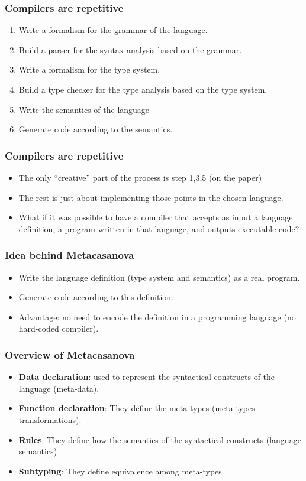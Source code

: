 \documentclass[10pt,a4paper]{beamer}
\begin{document}
\begin{frame}
	\frametitle{Compilers are repetitive}
	\begin{enumerate}
		\item Write a formalism for the grammar of the language.
		\item Build a parser for the syntax analysis based on the grammar.
		\item Write a formalism for the type system.
		\item Build a type checker for the type analysis based on the type system.
		\item Write the semantics of the language
		\item Generate code according to the semantics.
	\end{enumerate}
\end{frame}

\begin{frame}
	\frametitle{Compilers are repetitive}
	\begin{itemize}
		\item The only ``creative'' part of the process is step 1,3,5 (on the paper)
		\item The rest is just about implementing those points in the chosen language.
		\item What if it was possible to have a compiler that accepts as input a language definition, a program written in that language, and outputs executable code?
	\end{itemize}
\end{frame}

\begin{frame}
	\frametitle{Idea behind Metacasanova}
	\begin{itemize}
		\item Write the language definition (type system and semantics) as a real program.
		\item Generate code according to this definition.
		\item Advantage: no need to encode the definition in a programming language (no hard-coded compiler).
	\end{itemize}
\end{frame}

\begin{frame}
	\frametitle{Overview of Metacasanova}
	\begin{itemize}
		\item \textbf{Data declaration}: used to represent the syntactical constructs of the language (meta-data).
		\item \textbf{Function declaration}: They define the meta-types (meta-types transformations).
		\item \textbf{Rules}: They define how the semantics of the syntactical constructs (language semantics)
		\item \textbf{Subtyping}: They define equivalence among meta-types
	\end{itemize}
\end{frame}
\end{document}
